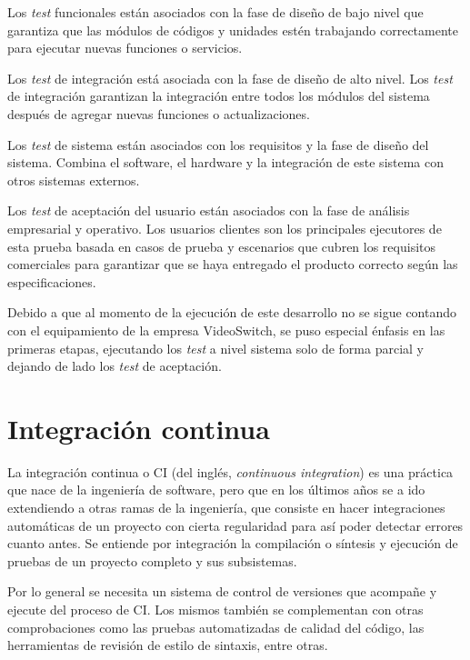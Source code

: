 Los \textit{test} funcionales están asociados con la fase de diseño de bajo nivel
que garantiza que las módulos de códigos y unidades estén trabajando correctamente
para ejecutar nuevas funciones o servicios.

Los \textit{test} de integración está asociada con la fase de diseño de alto
nivel. Los \textit{test} de integración garantizan la integración entre todos
los módulos del sistema después de agregar nuevas funciones o actualizaciones.

Los \textit{test} de sistema están asociados con los requisitos y la fase de
diseño del sistema. Combina el software, el hardware y la integración de este
sistema con otros sistemas externos.

Los \textit{test} de aceptación del usuario están asociados con la fase de
análisis empresarial y operativo. Los usuarios clientes son los principales
ejecutores de esta prueba basada en casos de prueba y escenarios que cubren los
requisitos comerciales para garantizar que se haya entregado el producto correcto
según las especificaciones.

Debido a que al momento de la ejecución de este desarrollo no se sigue contando
con el equipamiento de la empresa VideoSwitch, se puso especial énfasis en las
primeras etapas, ejecutando los \textit{test} a nivel sistema solo de forma
parcial y dejando de lado los \textit{test} de aceptación.

\section{Integración continua}

La integración continua o CI (del inglés, \textit{continuous integration}) es una
práctica que nace de la ingeniería de software, pero que en los últimos años se
a ido extendiendo a otras ramas de la ingeniería, que consiste en hacer
integraciones automáticas de un proyecto con cierta regularidad para así poder
detectar errores cuanto antes. Se entiende por integración la compilación o
síntesis y ejecución de pruebas de un proyecto completo y sus subsistemas. 

Por lo general se necesita un sistema de control de versiones que acompañe y
ejecute del proceso de CI\@. Los mismos también se complementan con otras
comprobaciones como las pruebas automatizadas de calidad del código, las
herramientas de revisión de estilo de sintaxis, entre otras.

